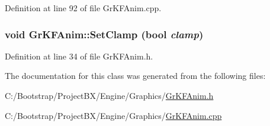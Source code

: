 Definition at line 92 of file GrKFAnim.cpp.\hypertarget{class_gr_k_f_anim_6eee5e58add387a6d0356805da36af38}{
\subsubsection[{SetClamp}]{\setlength{\rightskip}{0pt plus 5cm}void GrKFAnim::SetClamp (bool {\em clamp})}}
\label{class_gr_k_f_anim_6eee5e58add387a6d0356805da36af38}




Definition at line 34 of file GrKFAnim.h.

The documentation for this class was generated from the following files:\begin{CompactItemize}
\item 
C:/Bootstrap/ProjectBX/Engine/Graphics/\hyperlink{_gr_k_f_anim_8h}{GrKFAnim.h}\item 
C:/Bootstrap/ProjectBX/Engine/Graphics/\hyperlink{_gr_k_f_anim_8cpp}{GrKFAnim.cpp}\end{CompactItemize}
